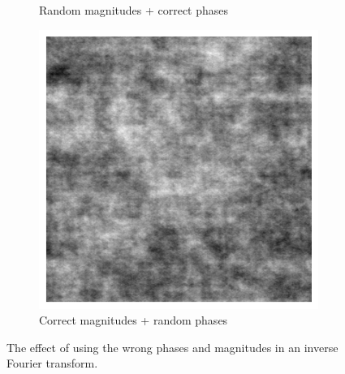 \documentclass{article}
\theoremstyle{plain}\theoremheaderfont{\normalfont\itshape}\theorembodyfont{\rmfamily}\theoremseparator{.}\newtheorem*{rem}{Remark}\newtheorem*{ex}{Example}\newtheorem*{proof}{Proof}\newtheorem*{altp}{Alternative proof}
\theoremstyle{plain}\theoremheaderfont{\normalfont\bfseries}\theorembodyfont{\rmfamily}\theoremseparator{.}\newtheorem{thm}{Theorem}[section]\newtheorem{lem}[thm]{Lemma}\newtheorem{prop}[thm]{Proposition}\newtheorem*{cor}{Corollary}\newtheorem{defn}[thm]{Definition}\newtheorem{clm}[thm]{Claim}\newtheorem{clminproof}{Claim}\newtheorem*{law}{Law}\newtheorem{pos}[thm]{Postulate}
\theoremstyle{break}\theoremheaderfont{\normalfont\itshape}\theorembodyfont{\rmfamily}\theoremseparator{.\medskip}\newtheorem*{proofskip}{Proof}\newtheorem*{exs}{Examples}\newtheorem*{rems}{Remarks}
\theoremstyle{break}\theoremheaderfont{\normalfont\bfseries}\theorembodyfont{\rmfamily}\theoremseparator{.\medskip}\newtheorem{lemskip}[thm]{Lemma}\newtheorem{defnskip}[thm]{Definition}\newtheorem{propskip}[thm]{Proposition}\newtheorem{thmskip}[thm]{Theorem}
\numberwithin{equation}{section}
\begin{document}
\begin{figure}[ht!]
\begin{subfigure}[h]{0.3\linewidth}
            \caption{Random magnitudes + correct phases}
        \end{subfigure}
        \hfill
        \begin{subfigure}[h]{0.3\linewidth}
            \includegraphics[width=\linewidth]{cat_rand_ph.png}
            \caption{Correct magnitudes + random phases}
        \end{subfigure}%
        \caption{The effect of using the wrong phases and magnitudes in an inverse Fourier transform.}
    \end{figure}
\end{document}
